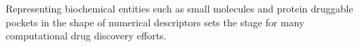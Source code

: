 
Representing biochemical entities such as small molecules and protein druggable pockets in the shape of numerical descriptors sets the stage for many computational drug discovery efforts. 